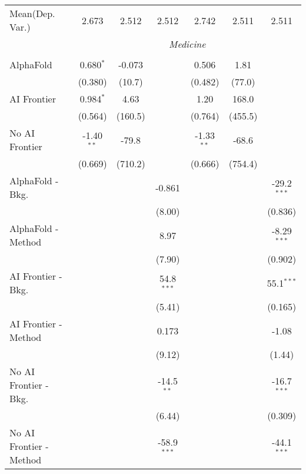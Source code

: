 \begin{tabular}{lcccccc}
Mean(Dep. Var.) & 2.673 & 2.512 & 2.512 & 2.742 & 2.511 & 2.511 \\
 & \multicolumn{6}{c}{\textit{Medicine}} \\ \\
   AlphaFold               & 0.680$^{*}$  & -0.073  &               & 0.506        & 1.81    &   \\   
                           & (0.380)      & (10.7)  &               & (0.482)      & (77.0)  &   \\   
   AI Frontier             & 0.984$^{*}$  & 4.63    &               & 1.20         & 168.0   &   \\   
                           & (0.564)      & (160.5) &               & (0.764)      & (455.5) &   \\   
   No AI Frontier          & -1.40$^{**}$ & -79.8   &               & -1.33$^{**}$ & -68.6   &   \\   
                           & (0.669)      & (710.2) &               & (0.666)      & (754.4) &   \\   
   AlphaFold - Bkg.        &              &         & -0.861        &              &         & -29.2$^{***}$\\   
                           &              &         & (8.00)        &              &         & (0.836)\\   
   AlphaFold - Method      &              &         & 8.97          &              &         & -8.29$^{***}$\\   
                           &              &         & (7.90)        &              &         & (0.902)\\   
   AI Frontier - Bkg.      &              &         & 54.8$^{***}$  &              &         & 55.1$^{***}$\\   
                           &              &         & (5.41)        &              &         & (0.165)\\   
   AI Frontier - Method    &              &         & 0.173         &              &         & -1.08\\   
                           &              &         & (9.12)        &              &         & (1.44)\\   
   No AI Frontier - Bkg.   &              &         & -14.5$^{**}$  &              &         & -16.7$^{***}$\\   
                           &              &         & (6.44)        &              &         & (0.309)\\   
   No AI Frontier - Method &              &         & -58.9$^{***}$ &              &         & -44.1$^{***}$\\   

\end{tabular}
